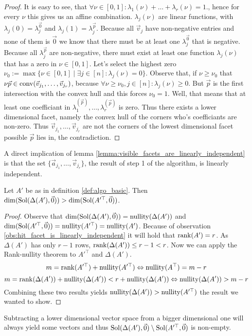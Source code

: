 \begin{proof}
    It is easy to see, that $\forall \nu\in[0, 1]: \lambda_1(\nu) + \dots + \lambda_r(\nu) = 1$., hence for every $\nu$ this gives us an affine combination. $\lambda_j(\nu)$ are linear functions, with $\lambda_j(0) = \lambda_j^{\vec 0}$ and $\lambda_j(1) = \lambda_j^{\vec p}$. Because all $\vec v_j$ have non-negative entries and none of them is $\vec 0$ we know that there must be at least one $\lambda_j^{\vec 0}$ that is negative. Because all $\lambda_j^{\vec p}$ are non-negative, there must exist at least one function $\lambda_j(\nu)$ that has a zero in $\nu \in [0, 1]$. Let's select the highest zero $\nu_0 := \max\{\nu \in [0, 1]\mid \exists j\in [n]\colon \lambda_j(\nu) = 0\}$. Observe that, if $\nu \geq \nu_0$ that $\nu\vec p \in \operatorname{conv}(\vec v_{j_1}, \dots, \vec v_{j_r})$, because $\forall \nu \geq \nu_0, j\in[n]\colon \lambda_j(\nu) \geq 0$. But $\vec p$ is the first intersection with the convex hull and this forces $\nu_0 = 1$. Well, that means that at least one coefficiant in $\lambda^{(\vec p)}_1, \dots, \lambda^{(\vec p)}_r$ is zero. Thus there exists a lower dimensional facet, namely the convex hull of the corners who's coefficiants are non-zero. Thus $\vec v_{j_1}, \dots, \vec v_{j_r}$ are not the corners of the lowest dimensional facet possible $\vec p$ lies in, the contradiction.
\end{proof}

\begin{observation}
    \label{obs:hit_facet_is_linearly_independent}
    A direct implication of lemma \ref{lemma:visible_facets_are_linearly_independent} is that the set $\{\vec a_{j_1}, \dots, \vec v_{j_r}\}$, the result of step 1 of the algorithm, is linearly independent.  
\end{observation}

\begin{lemma}
    Let $A'$ be as in definition \ref{def:algo_basic}. Then $\dim(\operatorname{Sol}(\Delta(A'), \vec0)) > \dim(\operatorname{Sol}(A'^\top, \vec0))$.
\end{lemma}
\begin{proof}
    Observe that $\dim(\operatorname{Sol}(\Delta(A'), \vec0)) = \operatorname{nullity}(\Delta(A'))$ and $\dim(\operatorname{Sol}(A'^\top, \vec0)) = \operatorname{nullity}(A'^\top) = \operatorname{nullity}(A')$. Because of observation \ref{obs:hit_facet_is_linearly_independent} it will hold that $\operatorname{rank}(A') = r$. As $\Delta(A')$ has only $r-1$ rows, $\operatorname{rank}(\Delta(A')) \leq r-1 < r$. Now we can apply the Rank-nullity theorem to $A'^\top$ and $\Delta(A')$.
    $$m = \operatorname{rank}(A'^\top) + \operatorname{nullity}(A'^\top) \Leftrightarrow \operatorname{nullity}(A^\top) = m - r$$
    $$m = \operatorname{rank}(\Delta(A')) + \operatorname{nullity}(\Delta(A')) < r + \operatorname{nullity}(\Delta(A'))\Leftrightarrow \operatorname{nullity}(\Delta(A')) > m - r$$
    Combining these two results yields $\operatorname{nullity}(\Delta(A')) > \operatorname{nullity}(A'^\top)$ the result we wanted to show.
\end{proof}
Subtracting a lower dimensional vector space from a bigger dimensional one will always yield some vectors and thus $\operatorname{Sol}(\Delta(A'), \vec0) \setminus \operatorname{Sol}(A'^\top, \vec0)$ is non-empty.

